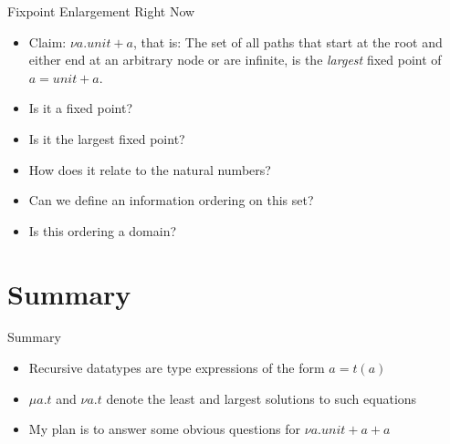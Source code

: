 \documentclass{beamer}
\begin{document}
\begin{frame}{Fixpoint Enlargement Right Now}

  \begin{itemize}
    \item Claim: $\nu a . unit + a$, that is: The set of all paths that start
          at the root and either end at an arbitrary node or are infinite, is
          the \emph{largest} fixed point of $a = unit + a$.
    \item Is it a fixed point?
    \item Is it the largest fixed point?
    \item How does it relate to the natural numbers?
    \item Can we define an information ordering on this set?
    \item Is this ordering a domain?
  \end{itemize}

\end{frame}


\section*{Summary}

\begin{frame}{Summary}

  \begin{itemize}
  \item
    Recursive datatypes are type expressions of the form $a = t(a)$
  \item
    $\mu a . t$ and $\nu a . t$ denote the least and largest solutions to such
    equations
  \item
    My plan is to answer some obvious questions for $\nu a . unit + a + a$
  \end{itemize}

\end{frame}
\end{document}
